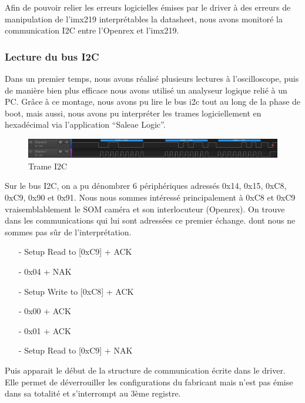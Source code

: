 {Afin de pouvoir relier les erreurs logicielles émises par le driver à des erreurs de
manipulation de l’imx219 interprétables la datasheet, nous avons monitoré la
communication I2C entre l’Openrex et l’imx219.

\subsubsection{Lecture du bus I2C}

Dans un premier temps, nous avons réalisé plusieurs lectures à l’oscilloscope, puis de
manière bien plus efficace nous avons utilisé un analyseur logique relié à un PC. Grâce à
ce montage, nous avons pu lire le bus i2c tout au long de la phase de boot, mais aussi,
nous avons pu interpréter les trames logiciellement en hexadécimal via l’application
“Saleae Logic”. \medskip

\begin{figure}[!htb]
    \centering
    \includegraphics[trim={0cm 0cm 0cm 0cm},clip,scale=0.35]{Figures/trame.png}
    \decoRule
    \caption{Trame I2C} \label{fig:trame}
\end{figure} 

Sur le bus I2C, on a pu dénombrer 6 périphériques adressés 0x14, 0x15, 0xC8, 0xC9,
0x90 et 0x91. Nous nous sommes intéressé principalement à 0xC8 et 0xC9
vraisemblablement le SOM caméra et son interlocuteur (Openrex). On trouve dans les
communications qui lui sont adressées ce premier échange. dont nous ne sommes pas
sûr de l’interprétation.

\begin{itemize}
    \item[-] Setup Read to [0xC9] + ACK
    \item[-] 0x04 + NAK
    \item[-] Setup Write to [0xC8] + ACK
    \item[-] 0x00 + ACK
    \item[-] 0x01 + ACK
    \item[-] Setup Read to [0xC9] + NAK
\end{itemize}

Puis apparait le début de la structure de communication écrite dans le driver. Elle permet
de déverrouiller les configurations du fabricant mais n’est pas émise dans sa totalité et
s'interrompt au 3ème registre.

}
